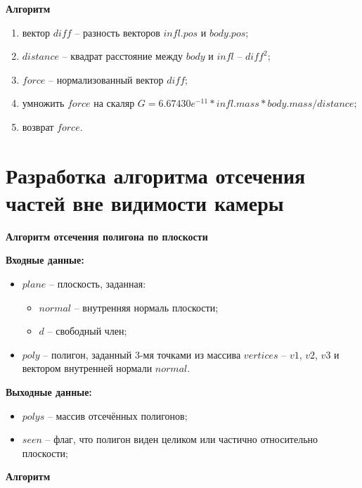 \textbf{Алгоритм}

\begin{enumerate}
	\item вектор $diff$ -- разность векторов $infl.pos$ и $body.pos$;
	\item $distance$ -- квадрат расстояние между $body$ и $infl$ -- $diff^2$;
	\item $force$ -- нормализованный вектор $diff$;
	\item умножить $force$ на скаляр $G=6.67430e^{-11} * infl.mass * body.mass / distance$;
	\item возврат $force$.
\end{enumerate}

\section{Разработка алгоритма отсечения частей вне видимости камеры}

\textbf{Алгоритм отсечения полигона по плоскости}

\textbf{Входные данные:}
\begin{itemize}
	\item $plane$ -- плоскость, заданная:
	\begin{itemize}
		\item $normal$ -- внутренняя нормаль плоскости;
		\item $d$ -- свободный член;
	\end{itemize}
	\item $poly$ -- полигон, заданный 3-мя точками из массива $vertices$ -- $v1$, $v2$, $v3$ и вектором внутренней нормали $normal$.
\end{itemize}

\textbf{Выходные данные:}
\begin{itemize}
	\item $polys$ -- массив отсечённых полигонов;
	\item $seen$ -- флаг, что полигон виден целиком или частично относительно плоскости;
\end{itemize}

\textbf{Алгоритм}



